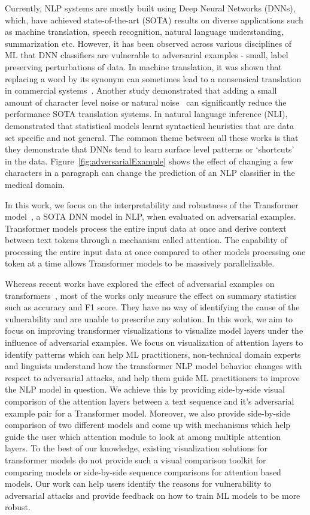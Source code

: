 \documentclass[journal]{vgtc}                %
\begin{document}
Currently, NLP systems are mostly built using Deep Neural Networks (DNNs), which,  have achieved state-of-the-art (SOTA) results on diverse applications such as machine translation, speech recognition, natural language understanding, summarization etc. However, it has been observed across various disciplines of ML that DNN classifiers are vulnerable to adversarial examples - small,  label preserving perturbations of data.  In machine translation, it was shown that replacing a word by its synonym can sometimes lead to a nonsensical translation in commercial systems~\cite{cheng2019robust}. Another study demonstrated that adding a small amount of character level noise or natural noise~\cite{belinkov2018synthetic} can significantly reduce the performance SOTA translation systems. In natural language inference (NLI), \cite{mccoy2019right} demonstrated that statistical models learnt syntactical heuristics that are data set specific and not general. The common theme between all these works is that they demonstrate that DNNs tend to learn surface level patterns or `shortcuts'~\cite{geirhos2020shortcut} in the data. Figure~\ref{fig:adversarialExample} shows the effect of changing a few characters in a paragraph can change the prediction of an NLP classifier in the medical domain.

In this work, we focus on the interpretability and robustness of the Transformer model~\cite{vaswani2017attention}, a SOTA DNN model in NLP, when evaluated on adversarial examples. Transformer models process the entire input data at once and derive context between text tokens through a mechanism called attention. The capability of processing the entire input data at once compared to other models processing one token at a time allows Transformer models to be massively parallelizable. 

Whereas recent works have explored the effect of adversarial examples on transformers~\cite{jin2019bert}, most of the works only measure the effect on summary statistics such as accuracy and F1 score. They have no way of identifying the cause of the vulnerability and are unable to prescribe any solution. In this work, we aim to focus on improving transformer visualizations to visualize model layers under the influence of adversarial examples. We focus on visualization of attention layers to identify patterns which can help ML practitioners, non-technical domain experts and linguists understand how the transformer NLP model behavior changes with respect to adversarial attacks, and help them guide ML practitioners to improve the NLP model in question. We achieve this by providing side-by-side visual comparison of the attention layers between a text sequence and it's adversarial example pair for a Transformer model. Moreover, we also provide side-by-side comparison of two different models and come up with mechanisms which help guide the user which attention module to look at among multiple attention layers. To the best of our knowledge, existing visualization solutions for transformer models do not provide such a visual comparison toolkit for comparing models or side-by-side sequence comparisons for attention based models. Our work can help users identify the reasons for vulnerability to adversarial attacks and provide feedback on how to train ML models to be more robust.
\end{document}
